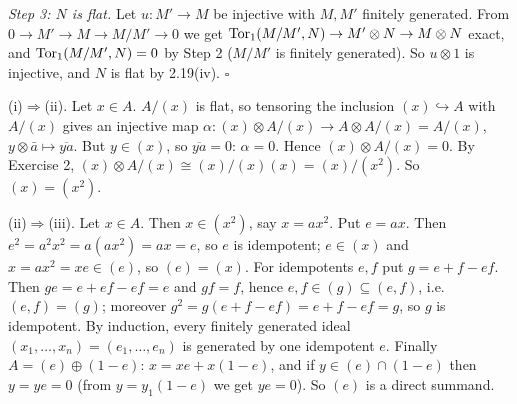 \documentclass[11pt]{article}
\begin{document}
\emph{Step 3: $N$ is flat.} Let $u:M'\to M$ be injective with $M,M'$ finitely generated. From $0\to M'\to M\to M/M'\to0$ we get $\operatorname{Tor}_1(M/M',N)\to M'\otimes N\to M\otimes N$ exact, and $\operatorname{Tor}_1(M/M',N)=0$ by Step 2 ($M/M'$ is finitely generated). So $u\otimes1$ is injective, and $N$ is flat by 2.19(iv). \hfill$\square$

\pf
(i)$\Rightarrow$(ii). Let $x\in A$. $A/(x)$ is flat, so tensoring the inclusion $(x)\hookrightarrow A$ with $A/(x)$ gives an injective map $\alpha:(x)\otimes A/(x)\to A\otimes A/(x)=A/(x)$, $y\otimes\bar a\mapsto\overline{ya}$. But $y\in(x)$, so $\overline{ya}=0$: $\alpha=0$. Hence $(x)\otimes A/(x)=0$. By Exercise 2, $(x)\otimes A/(x)\cong(x)/(x)(x)=(x)/(x^2)$. So $(x)=(x^2)$.

(ii)$\Rightarrow$(iii). Let $x\in A$. Then $x\in(x^2)$, say $x=ax^2$. Put $e=ax$. Then $e^2=a^2x^2=a(ax^2)=ax=e$, so $e$ is idempotent; $e\in(x)$ and $x=ax^2=xe\in(e)$, so $(e)=(x)$. For idempotents $e,f$ put $g=e+f-ef$. Then $ge=e+ef-ef=e$ and $gf=f$, hence $e,f\in(g)\subseteq(e,f)$, i.e.\ $(e,f)=(g)$; moreover $g^2=g(e+f-ef)=e+f-ef=g$, so $g$ is idempotent. By induction, every finitely generated ideal $(x_1,\dots,x_n)=(e_1,\dots,e_n)$ is generated by one idempotent $e$. Finally $A=(e)\oplus(1-e)$: $x=xe+x(1-e)$, and if $y\in(e)\cap(1-e)$ then $y=ye=0$ (from $y=y_1(1-e)$ we get $ye=0$). So $(e)$ is a direct summand.
\end{document}

